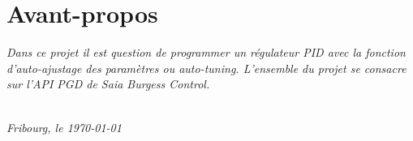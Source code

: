 \part*{Avant-propos}

\emph{Dans ce projet il est question de programmer un régulateur PID avec la fonction d'auto-ajustage des paramètres ou auto-tuning. L'ensemble du projet se consacre sur l'API PGD de Saia Burgess Control.}

\begin{flushright}
{\makeatletter\itshape
    \@author \\
    Fribourg, le \today \\
\makeatother}
\end{flushright}
